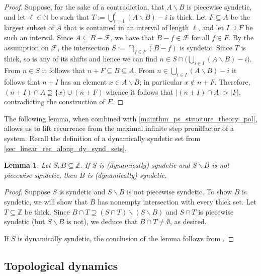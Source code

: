 \documentclass{article}
\theoremstyle{plain}
\newtheorem{lemma}[Theorem]{Lemma}
\theoremstyle{claim}
\theoremstyle{definition}
\theoremstyle{plain}
\theoremstyle{plain}
\newcommand{\N}{\mathbb{N}}
\newcommand{\Z}{\mathbb{Z}}
\renewcommand{\setminus}{\backslash}
\newcommand{\1}{\boldsymbol{1}}
\newcommand{\family}{\mathscr{F}}
\begin{document}
\begin{proof}
    Suppose, for the sake of a contradiction, that $A\setminus B$ is piecewise syndetic, and let $\ell\in\N$ be such that $T:=\bigcup_{i=1}^\ell (A\setminus B)-i$ is thick.
    Let $F\subseteq A$ be the largest subset of $A$ that is contained in an interval of length $\ell$, and let $I\supseteq F$ be such an interval. 
    Since $A \subseteq B-\family$, we have that $B-f \in \family$ for all $f \in F$.  
    By the assumption on $\family$, the intersection $S:=\bigcap_{f \in F} (B-f)$ is syndetic.
    Since $T$ is thick, so is any of its shifts and hence we can find $n\in S\cap \big(\bigcup_{i\in I}(A\setminus B)-i\big)$.
    From $n\in S$ it follows that $n+F\subseteq B\subseteq A$.
    From $n\in \bigcup_{i\in I}(A\setminus B)-i$ it follows that $n+I$ has an element $x\in A\setminus B$; in particular $x\notin n+F$.
    Therefore, $(n+I)\cap A\supseteq\{x\}\cup(n+F)$ whence it follows that $|(n+I)\cap A|>|F|$, contradicting the construction of $F$.
\end{proof}

The following lemma, when combined with \cref{mainthm_ps_structure_theory_pol}, allows us to lift recurrence from the maximal infinite step pronilfactor of a system. Recall the definition of a dynamically syndetic set from \cref{sec_linear_rec_along_dy_synd_sets}.

\begin{lemma}
\label{lemma_pwssetdifference}
    Let $S, B\subseteq\Z$. If $S$ is (dynamically) syndetic and $S \setminus B$ is not piecewise syndetic, then $B$ is (dynamically) syndetic.
\end{lemma}
\begin{proof}
    Suppose $S$ is syndetic and $S \setminus B$ is not piecewise syndetic. To show $B$ is syndetic, we will show that $B$ has nonempty intersection with every thick set.
    Let $T\subseteq\Z$ be thick.
    Since $B\cap T\supseteq(S\cap T)\setminus (S\setminus B)$ and $S\cap T$ is piecewise syndetic (but $S\setminus B$ is not), we deduce that $B\cap T\neq\emptyset$, as desired.  

    If $S$ is dynamically syndetic, the conclusion of the lemma follows from \cite[Theorem G]{glasscock_le_2025}.
\end{proof}

\subsection{Topological dynamics}
\label{sec_prelims_top_dyn}
\end{document}
